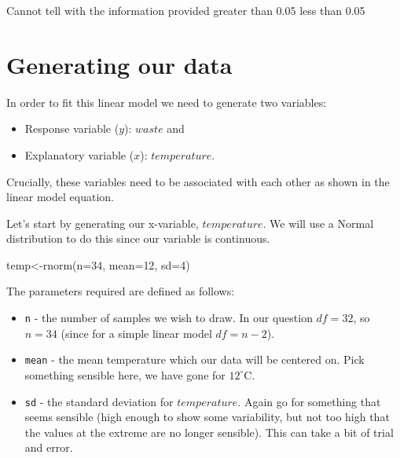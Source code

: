 \documentclass[
]{book}
\newenvironment{Shaded}{\begin{snugshade}}{\end{snugshade}}
\newcommand{\AttributeTok}[1]{\textcolor[rgb]{0.77,0.63,0.00}{#1}}
\newcommand{\DecValTok}[1]{\textcolor[rgb]{0.00,0.00,0.81}{#1}}
\newcommand{\FunctionTok}[1]{\textcolor[rgb]{0.00,0.00,0.00}{#1}}
\newcommand{\NormalTok}[1]{#1}
\newcommand{\OtherTok}[1]{\textcolor[rgb]{0.56,0.35,0.01}{#1}}
\providecommand{\tightlist}{%
  \setlength{\itemsep}{0pt}\setlength{\parskip}{0pt}}
\begin{document}
\hypertarget{radio_XPMJYNFZEM}{}
{Cannot tell with the information provided} {greater than 0.05} {less than 0.05}

\hypertarget{generating-our-data}{%
\section{Generating our data}\label{generating-our-data}}

In order to fit this linear model we need to generate two variables:

\begin{itemize}
\tightlist
\item
  Response variable (\(y\)): \(waste\) and
\item
  Explanatory variable (\(x\)): \(temperature\).
\end{itemize}

Crucially, these variables need to be associated with each other as shown in the linear model equation.

Let's start by generating our x-variable, \(temperature\). We will use a Normal distribution to do this since our variable is continuous.

\begin{Shaded}
\begin{Highlighting}[]
\NormalTok{temp}\OtherTok{\textless{}{-}}\FunctionTok{rnorm}\NormalTok{(}\AttributeTok{n=}\DecValTok{34}\NormalTok{, }\AttributeTok{mean=}\DecValTok{12}\NormalTok{, }\AttributeTok{sd=}\DecValTok{4}\NormalTok{)}
\end{Highlighting}
\end{Shaded}

The parameters required are defined as follows:

\begin{itemize}
\tightlist
\item
  \texttt{n} - the number of samples we wish to draw. In our question \(df=32\), so \(n=34\) (since for a simple linear model \(df=n-2\)).
\item
  \texttt{mean} - the mean temperature which our data will be centered on. Pick something sensible here, we have gone for \(12^{\circ}\)C.
\item
  \texttt{sd} - the standard deviation for \(temperature\). Again go for something that seems sensible (high enough to show some variability, but not too high that the values at the extreme are no longer sensible). This can take a bit of trial and error.
\end{itemize}

  
\end{document}
